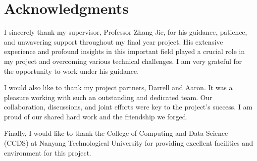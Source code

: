 \chapter*{Acknowledgments}

I sincerely thank my supervisor, Professor Zhang Jie, for his guidance, patience, and unwavering support throughout my final year project. His extensive experience and profound insights in this important field played a crucial role in my project and overcoming various technical challenges. I am very grateful for the opportunity to work under his guidance.

I would also like to thank my project partners, Darrell and Aaron. It was a pleasure working with such an outstanding and dedicated team. Our collaboration, discussions, and joint efforts were key to the project's success. I am proud of our shared hard work and the friendship we forged.

Finally, I would like to thank the College of Computing and Data Science (CCDS) at Nanyang Technological University for providing excellent facilities and environment for this project.
